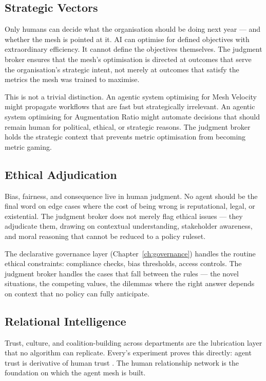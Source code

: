 \subsection{Strategic Vectors}

Only humans can decide what the organisation should be doing next year --- and whether the mesh is pointed at it. AI can optimise for defined objectives with extraordinary efficiency. It cannot define the objectives themselves. The judgment broker ensures that the mesh's optimisation is directed at outcomes that serve the organisation's strategic intent, not merely at outcomes that satisfy the metrics the mesh was trained to maximise.

This is not a trivial distinction. An agentic system optimising for Mesh Velocity might propagate workflows that are fast but strategically irrelevant. An agentic system optimising for Augmentation Ratio might automate decisions that should remain human for political, ethical, or strategic reasons. The judgment broker holds the strategic context that prevents metric optimisation from becoming metric gaming.

\subsection{Ethical Adjudication}

Bias, fairness, and consequence live in human judgment. No agent should be the final word on edge cases where the cost of being wrong is reputational, legal, or existential. The judgment broker does not merely flag ethical issues --- they adjudicate them, drawing on contextual understanding, stakeholder awareness, and moral reasoning that cannot be reduced to a policy ruleset.

The declarative governance layer (Chapter~\ref{ch:governance}) handles the routine ethical constraints: compliance checks, bias thresholds, access controls. The judgment broker handles the cases that fall between the rules --- the novel situations, the competing values, the dilemmas where the right answer depends on context that no policy can fully anticipate.

\subsection{Relational Intelligence}

Trust, culture, and coalition-building across departments are the lubrication layer that no algorithm can replicate. Every's experiment proves this directly: agent trust is derivative of human trust \parencite{Shipper2026}. The human relationship network is the foundation on which the agent mesh is built.

